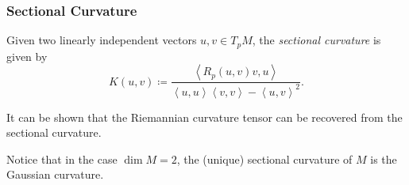 \documentclass[handout]{beamer}
\DeclareMathOperator{\End}{End}
\DeclareMathOperator{\id}{id}
\DeclareMathOperator{\trace}{tr}
\DeclareMathOperator{\Hol}{Hol}
\DeclareMathOperator{\Ric}{Ric}
\DeclareMathOperator{\Scal}{Scal}
\newcommand{\inprod}[2]{\left\langle #1, #2 \right\rangle}
\theoremstyle{definition}
\begin{document}






\begin{frame}
    \frametitle{Sectional Curvature}

    \pause
    \begin{definition}
        Given two linearly independent vectors $u, v \in T_pM$, the \emph{sectional curvature}
        is given by
        \[
            K(u,v) \coloneqq \frac{\inprod{R_p(u,v)v}{u}}{\inprod{u}{u}\inprod{v}{v} - \inprod{u}{v}^2}.
        \]
    \end{definition}

    \pause
    It can be shown that the Riemannian curvature tensor can be recovered from the
    sectional curvature.

    \pause
    Notice that in the case $\dim M = 2$, the (unique) sectional curvature of $M$ is the
    Gaussian curvature.

\end{frame}
\end{document}
